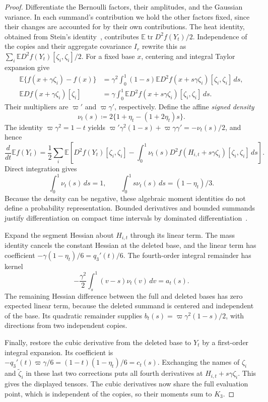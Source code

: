 \documentclass[11pt,letterpaper]{article}
\theoremstyle{remark}
\newcommand{\E}{\mathbb E}
\newcommand{\tr}{\operatorname{tr}}
\newcommand{\dd}{\,d}
\begin{document}
\begin{proof}
Differentiate the Bernoulli factors, their amplitudes, and the Gaussian
variance. In each summand's contribution we hold the other factors
fixed, since their changes are accounted for by their own contributions. The heat
identity, obtained from Stein's identity~\cite{Stein1981}, contributes
\(\E\tr D^2f(Y_t)/2\). Independence of the copies and their
aggregate covariance \(I_r\) rewrite this as
\(\sum_i\E D^2f(Y_t)[\zeta_i,\zeta_i]/2\).
For a fixed base \(x\), centering and integral Taylor expansion give
\begin{align*}
 \E\{f(x+\gamma\zeta_i)-f(x)\}
 &=\gamma^2\int_0^1(1-s)
        \E D^2f(x+s\gamma\zeta_i)[\zeta_i,\zeta_i]\dd s,\\
 \E Df(x+\gamma\zeta_i)[\zeta_i]
 &=\gamma\int_0^1
        \E D^2f(x+s\gamma\zeta_i)[\zeta_i,\zeta_i]\dd s.
\end{align*}
Their multipliers are \(\varpi'\) and \(\varpi\gamma'\),
respectively. Define the affine \emph{signed density}
\[
 \nu_t(s)\coloneqq2\{1+\eta_t-(1+2\eta_t)s\}.
\]
The identity \(\varpi\gamma^2=1-t\) yields
\(\varpi'\gamma^2(1-s)+\varpi\gamma\gamma'=-\nu_t(s)/2\),
and hence
\begin{equation}
 \frac{d}{dt}\E f(Y_t)
 =\frac12\sum_i\E\left[
    D^2f(Y_t)[\zeta_i,\zeta_i]
    -\int_0^1\nu_t(s)D^2f(H_{i,t}+s\gamma\zeta_i)
                       [\zeta_i,\zeta_i]\dd s\right].
 \label{appx-an:signed-hessian}
\end{equation}
Direct integration gives
\begin{equation}
 \int_0^1\nu_t(s)\dd s=1,\qquad
 \int_0^1s\nu_t(s)\dd s=(1-\eta_t)/3.
 \label{appx-an:signed-moments}
\end{equation}
Because the density can be negative, these algebraic moment identities
do not define a probability representation. Bounded derivatives and bounded
summands justify differentiation on compact time intervals by
dominated differentiation~\cite[Section~2.3]{Folland1999}.

Expand the segment Hessian about \(H_{i,t}\) through its linear term.
The mass identity cancels the constant Hessian at the deleted base,
and the linear term has coefficient
\(-\gamma(1-\eta_t)/6=q_3'(t)/6\). The fourth-order integral
remainder has kernel
\[
 -\frac{\gamma^2}{2}\int_s^1(v-s)\nu_t(v)\dd v=a_t(s).
\]
The remaining Hessian difference between the full and deleted bases
has zero expected linear term, because the deleted summand is centered
and independent of the base. Its quadratic remainder supplies
\(b_t(s)=\varpi\gamma^2(1-s)/2\), with directions from two
independent copies.

Finally, restore the cubic derivative from the deleted base to \(Y_t\)
by a first-order integral expansion. Its coefficient is
\(-q_3'(t)\varpi\gamma/6=(1-t)(1-\eta_t)/6=c_t(s)\).
Exchanging the names of \(\zeta_i\) and \(\widetilde\zeta_i\)
in these last two corrections puts all fourth derivatives at
\(H_{i,t}+s\gamma\zeta_i\). This gives the displayed tensors.
The cubic derivatives now share the full evaluation point, which
is independent of the copies, so their moments sum to \(K_3\).
\end{proof}
\end{document}
